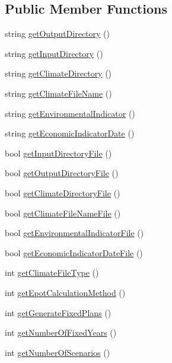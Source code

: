 \subsection*{Public Member Functions}
\begin{DoxyCompactItemize}
\item 
string \hyperlink{classsystem_data_a836f74ba0df2cec8f0768226595953c0}{getOutputDirectory} ()
\item 
string \hyperlink{classsystem_data_ab3bd7ec3d128a6403357797b900a30a3}{getInputDirectory} ()
\item 
string \hyperlink{classsystem_data_a94cafcbc5d88c5b740220c486108b967}{getClimateDirectory} ()
\item 
string \hyperlink{classsystem_data_ab95f0efd761e5802a866b52c402bf833}{getClimateFileName} ()
\item 
string \hyperlink{classsystem_data_a2c31cad937091c0cc2a544799f5411d9}{getEnvironmentalIndicator} ()
\item 
string \hyperlink{classsystem_data_af2503f1dff3caf9eb839cd8f7ae0d5c6}{getEconomicIndicatorDate} ()
\item 
bool \hyperlink{classsystem_data_a9ff8bbdd866ea0b13fa33055d14a76ba}{getInputDirectoryFile} ()
\item 
bool \hyperlink{classsystem_data_a5b659040efca51ed328798ced3444dbc}{getOutputDirectoryFile} ()
\item 
bool \hyperlink{classsystem_data_a2d4ace1618c6d0b5f75aa1d9ae350f50}{getClimateDirectoryFile} ()
\item 
bool \hyperlink{classsystem_data_a07e184a45dc23456cd374197e211f828}{getClimateFileNameFile} ()
\item 
bool \hyperlink{classsystem_data_a4ef1aa7d91be76730dae1f4c1d5492a2}{getEnvironmentalIndicatorFile} ()
\item 
bool \hyperlink{classsystem_data_a725e22504831099453d7577ad8f96805}{getEconomicIndicatorDateFile} ()
\item 
int \hyperlink{classsystem_data_ab9418fe93192f3293c07d127c67abbe7}{getClimateFileType} ()
\item 
int \hyperlink{classsystem_data_acb8a088653b1ae84af7b1aa16775b055}{getEpotCalculationMethod} ()
\item 
int \hyperlink{classsystem_data_a5af755e5ca70bb476c46614b49e63c91}{getGenerateFixedPlans} ()
\item 
int \hyperlink{classsystem_data_ab173b540ef3ff6f368291b4fe98743cd}{getNumberOfFixedYears} ()
\item 
int \hyperlink{classsystem_data_a03f7e0e3613b896656dd69ea4e18331f}{getNumberOfScenarios} ()

\end{DoxyCompactItemize}
